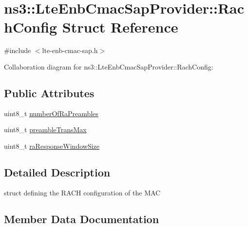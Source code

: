 \hypertarget{structns3_1_1LteEnbCmacSapProvider_1_1RachConfig}{}\section{ns3\+:\+:Lte\+Enb\+Cmac\+Sap\+Provider\+:\+:Rach\+Config Struct Reference}
\label{structns3_1_1LteEnbCmacSapProvider_1_1RachConfig}


{\ttfamily \#include $<$lte-\/enb-\/cmac-\/sap.\+h$>$}



Collaboration diagram for ns3\+:\+:Lte\+Enb\+Cmac\+Sap\+Provider\+:\+:Rach\+Config\+:
\subsection*{Public Attributes}
\begin{DoxyCompactItemize}
\item 
uint8\+\_\+t \hyperlink{structns3_1_1LteEnbCmacSapProvider_1_1RachConfig_aaf2f9cefb4961854d40da9b4321d5c8d}{number\+Of\+Ra\+Preambles}
\item 
uint8\+\_\+t \hyperlink{structns3_1_1LteEnbCmacSapProvider_1_1RachConfig_a0bb12f70e5459de4c06213a81eb4eef9}{preamble\+Trans\+Max}
\item 
uint8\+\_\+t \hyperlink{structns3_1_1LteEnbCmacSapProvider_1_1RachConfig_a8b2cadac9946eb9a8cffdbdc0d9840da}{ra\+Response\+Window\+Size}
\end{DoxyCompactItemize}


\subsection{Detailed Description}
struct defining the R\+A\+CH configuration of the M\+AC 

\subsection{Member Data Documentation}
